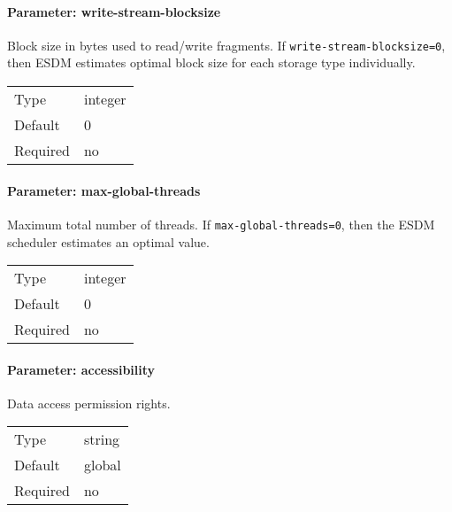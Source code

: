 \paragraph{Parameter: write-stream-blocksize}
Block size in bytes used to read/write fragments.
If \lstinline|write-stream-blocksize=0|, then ESDM estimates optimal block size for each storage type individually.

\begin{preserve}
  \noindent
  \begin{tabular}{ll}
    Type     & integer \\ 
    Default  & 0       \\ 
    Required & no      \\ 
  \end{tabular}
\end{preserve}
\FloatBarrier
\vspace{\gapsize}

\paragraph{Parameter: max-global-threads}
Maximum total number of threads.
If \lstinline|max-global-threads=0|, then the ESDM scheduler estimates an optimal value.

\begin{preserve}
  \noindent
  \begin{tabular}{ll}
    Type     & integer \\ 
    Default  & 0       \\ 
    Required & no      \\ 
  \end{tabular}
\end{preserve}
\FloatBarrier
\vspace{\gapsize}

\paragraph{Parameter: accessibility}
Data access permission rights.

\begin{preserve}
  \noindent
  \begin{tabular}{ll}
    Type     & string \\ 
    Default  & global \\ 
    Required & no     \\ 
  \end{tabular}
\end{preserve}

